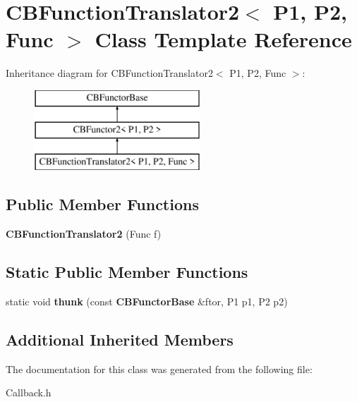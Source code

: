 \section{C\+B\+Function\+Translator2$<$ P1, P2, Func $>$ Class Template Reference}
\label{classCBFunctionTranslator2}
Inheritance diagram for C\+B\+Function\+Translator2$<$ P1, P2, Func $>$\+:\begin{figure}[H]
\begin{center}
\leavevmode
\includegraphics[height=3.000000cm]{classCBFunctionTranslator2}
\end{center}
\end{figure}
\subsection*{Public Member Functions}
\begin{DoxyCompactItemize}
\item 
{\bfseries C\+B\+Function\+Translator2} (Func f)\label{classCBFunctionTranslator2_a44ecf241306c6588d3498703101c08cb}

\end{DoxyCompactItemize}
\subsection*{Static Public Member Functions}
\begin{DoxyCompactItemize}
\item 
static void {\bfseries thunk} (const {\bf C\+B\+Functor\+Base} \&ftor, P1 p1, P2 p2)\label{classCBFunctionTranslator2_ac87f753ab63e1514c4d025b10dba2fc4}

\end{DoxyCompactItemize}
\subsection*{Additional Inherited Members}


The documentation for this class was generated from the following file\+:\begin{DoxyCompactItemize}
\item 
Callback.\+h\end{DoxyCompactItemize}
